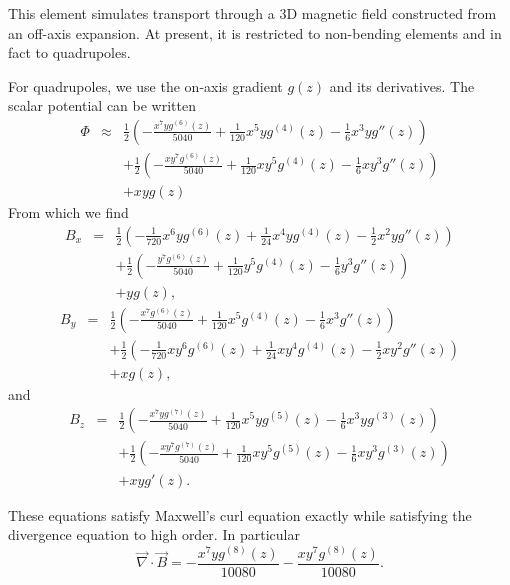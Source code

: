 This element simulates transport through a 3D magnetic field constructed from
an off-axis expansion.
At present, it is restricted to non-bending elements and in fact to quadrupoles.

For quadrupoles, we use the on-axis gradient $g(z)$ and its derivatives.
The scalar potential can be written 
\begin{eqnarray}
\Phi & \approx & \frac{1}{2} \left(-\frac{x^7 y g^{(6)}(z)}{5040}+\frac{1}{120} x^5 y g^{(4)}(z)-\frac{1}{6} x^3 y g''(z)\right) \\
 & &  +\frac{1}{2} \left(-\frac{x y^7 g^{(6)}(z)}{5040}+\frac{1}{120} x y^5 g^{(4)}(z)-\frac{1}{6} x y^3 g''(z)\right) \\
 & & + x y g(z)
\end{eqnarray}
From which we find
\begin{eqnarray}
B_x & = & \frac{1}{2} \left(-\frac{1}{720} x^6 y g^{(6)}(z)+\frac{1}{24} x^4 y g^{(4)}(z)-\frac{1}{2} x^2 y g''(z)\right) \\
 & & + \frac{1}{2} \left(-\frac{y^7 g^{(6)}(z)}{5040}+\frac{1}{120} y^5 g^{(4)}(z)-\frac{1}{6} y^3 g''(z)\right) \\ 
 & & +y g(z),
\end{eqnarray}
\begin{eqnarray}
B_y & = & \frac{1}{2} \left(-\frac{x^7 g^{(6)}(z)}{5040}+\frac{1}{120} x^5 g^{(4)}(z)-\frac{1}{6} x^3 g''(z)\right) \\
& & + \frac{1}{2}  \left(-\frac{1}{720} x y^6 g^{(6)}(z)+\frac{1}{24} x y^4 g^{(4)}(z)-\frac{1}{2} x y^2 g''(z)\right) \\
& & +x g(z),
\end{eqnarray}
and
\begin{eqnarray}
B_z & = & \frac{1}{2} \left(-\frac{x^7 y g^{(7)}(z)}{5040}+\frac{1}{120} x^5 y g^{(5)}(z)-\frac{1}{6} x^3 y g^{(3)}(z)\right) \\
& &  + \frac{1}{2} \left(-\frac{x y^7 g^{(7)}(z)}{5040}+\frac{1}{120} x y^5 g^{(5)}(z)-\frac{1}{6} x y^3 g^{(3)}(z)\right) \\
& & + x y g'(z).
\end{eqnarray}

These equations satisfy Maxwell's curl equation exactly while satisfying the divergence equation to high order.
In particular
\begin{equation}
\vec{\nabla} \cdot \vec{B} = -\frac{x^7 y g^{(8)}(z)}{10080}-\frac{x y^7 g^{(8)}(z)}{10080}.
\end{equation}

